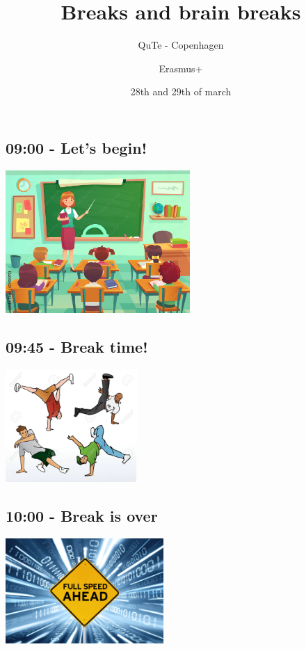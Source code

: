 \documentclass[12pt,notes]{beamer}
\institute{}
\author{Erasmus+}
\date{28th and 29th of march}
\title{Breaks and brain breaks}
\subtitle{QuTe - Copenhagen}
\begin{document}
\maketitle

\begin{frame}[label={sec:org77344f3}]{}
\section{09:00 - Let's begin!}
\begin{center}
\includegraphics[width=7cm]{./img/lets_begin.jpg}
\end{center}
\end{frame}

\begin{frame}[label={sec:org659fa2d}]{}
\section{09:45 - Break time!}

\begin{center}
\includegraphics[width=5cm]{./img/break_dancing.png}
\end{center}
\end{frame}

\begin{frame}[label={sec:org881afa8}]{}
\section{10:00 - Break is over}

\begin{center}
\includegraphics[width=6cm]{./img/Full-Speed-Ahead.jpg}
\end{center}
\end{frame}
\end{document}
